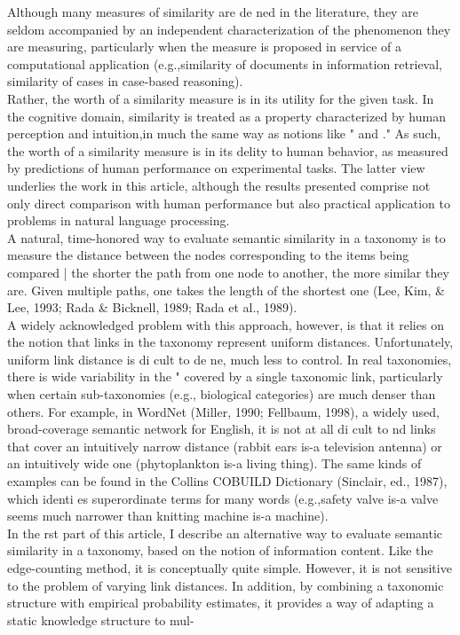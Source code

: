 Although many measures of similarity are de ned in the literature, they are seldom accompanied by an independent characterization of the phenomenon they are measuring, particularly when the measure is proposed in service of a computational application (e.g.,similarity of documents in information retrieval, similarity of cases in case-based reasoning).\\
Rather, the worth of a similarity measure is in its utility for the given task. In the cognitive domain, similarity is treated as a property characterized by human perception and intuition,in much the same way as notions like \plausibility" and \typicality." As such, the worth of a similarity measure is in its delity to human behavior, as measured by predictions of human performance on experimental tasks. The latter view underlies the work in this article, although the results presented comprise not only direct comparison with human performance but also practical application to problems in natural language processing.\\
    A natural, time-honored way to evaluate semantic similarity in a taxonomy is to measure the distance between the nodes corresponding to the items being compared | the shorter the path from one node to another, the more similar they are. Given multiple paths, one
takes the length of the shortest one (Lee, Kim, & Lee, 1993; Rada & Bicknell, 1989; Rada et al., 1989).\\
    A widely acknowledged problem with this approach, however, is that it relies on the notion that links in the taxonomy represent uniform distances. Unfortunately, uniform link distance is di cult to de ne, much less to control. In real taxonomies, there is wide
variability in the \distance" covered by a single taxonomic link, particularly when certain sub-taxonomies (e.g., biological categories) are much denser than others. For example, in WordNet (Miller, 1990; Fellbaum, 1998), a widely used, broad-coverage semantic network for English, it is not at all di cult to nd links that cover an intuitively narrow distance (rabbit ears is-a television antenna) or an intuitively wide one (phytoplankton
is-a living thing). The same kinds of examples can be found in the Collins COBUILD Dictionary (Sinclair, ed., 1987), which identi es superordinate terms for many words (e.g.,safety valve is-a valve seems much narrower than knitting machine is-a machine).\\
    In the rst part of this article, I describe an alternative way to evaluate semantic similarity in a taxonomy, based on the notion of information content. Like the edge-counting method, it is conceptually quite simple. However, it is not sensitive to the problem of varying link distances. In addition, by combining a taxonomic structure with empirical probability estimates, it provides a way of adapting a static knowledge structure to mul-
